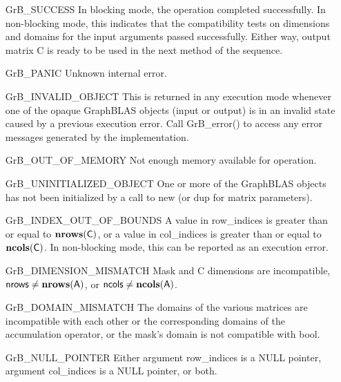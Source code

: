 \begin{itemize}[leftmargin=2.1in]
    \item[{\sf GrB\_SUCCESS}]         In blocking mode, the operation completed
    successfully. In non-blocking mode, this indicates that the compatibility 
    tests on dimensions and domains for the input arguments passed successfully. 
    Either way, output matrix {\sf C} is ready to be used in the next method of 
    the sequence.

    \item[{\sf GrB\_PANIC}]           Unknown internal error.
    
    \item[{\sf GrB\_INVALID\_OBJECT}] This is returned in any execution mode 
    whenever one of the opaque GraphBLAS objects (input or output) is in an invalid 
    state caused by a previous execution error.  Call {\sf GrB\_error()} to access 
    any error messages generated by the implementation.

    \item[{\sf GrB\_OUT\_OF\_MEMORY}]  Not enough memory available for operation.

    \item[{\sf GrB\_UNINITIALIZED\_OBJECT}] One or more of the GraphBLAS objects 
    has not been initialized by a call to {\sf new} (or {\sf dup} for matrix
    parameters).

    \item[{\sf GrB\_INDEX\_OUT\_OF\_BOUNDS}]  A value in {\sf row\_indices} 
    is greater than or equal to $\bold{nrows}({\sf C})$, or a value in 
    {\sf col\_indices} is greater than or equal to $\bold{ncols}({\sf C})$.  In 
    non-blocking mode, this can be reported as an execution error.
    
    \item[{\sf GrB\_DIMENSION\_MISMATCH}] {\sf Mask} and {\sf C} dimensions are
    incompatible, ${\sf nrows} \neq \bold{nrows}({\sf A})$, or 
    ${\sf ncols} \neq \bold{ncols}({\sf A})$.

    \item[{\sf GrB\_DOMAIN\_MISMATCH}]     The domains of the various matrices
    are incompatible with each other or the corresponding domains of the 
    accumulation operator, or the mask's domain is not compatible with {\sf bool}.

    \item[{\sf GrB\_NULL\_POINTER}] Either argument {\sf row\_indices} is a {\sf NULL} pointer,
	    argument {\sf col\_indices} is a {\sf NULL} pointer, or both.
\end{itemize}

